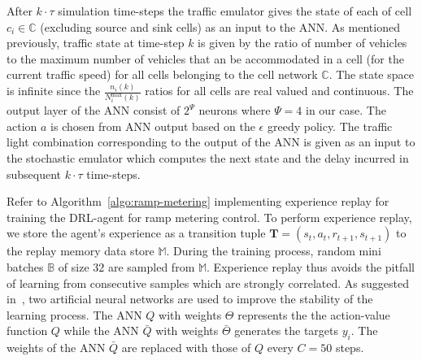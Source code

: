 \documentclass{sig-alternate-05-2015}
\begin{document}
After $k\cdot\tau$ simulation time-steps the traffic emulator gives the state of each of cell $c_i \in \mathbb{C}$ (excluding source and sink cells) as an input to the ANN.  As mentioned previously, traffic state at time-step $k$ is given by the ratio of number of vehicles to the maximum number of vehicles that an be accommodated in a cell (for the current traffic speed) for all cells belonging to the cell network $\mathbb{C}$. The state space is infinite since the $\frac{n_i(k)}{N_i^{\text{max}}(k)}$ ratios for all cells are real valued and continuous. The output layer of the ANN consist of $2^\Psi$ neurons where $\Psi=4$ in our case. The action $a$ is chosen from ANN output based on the $\epsilon$ greedy policy. The traffic light combination corresponding to the output of the ANN is given as an input to the stochastic emulator which computes the next state and the delay incurred in subsequent $k\cdot\tau$ time-steps. 

Refer to Algorithm~\ref{algo:ramp-metering} implementing experience replay for training the DRL-agent for ramp metering control. To perform experience replay,  we store the agent's experience as a transition tuple  $\mathbf{T}=(s_t, a_t,r_{t+1}, s_{t+1})$ to the replay memory data store $\mathbb{M}$.  During the training process, random mini batches $\mathbb{B}$ of size $32$  are sampled  from  $\mathbb{M}$. Experience replay thus avoids the pitfall of learning from consecutive samples which are strongly correlated. As suggested in~\cite{mnih2015human}, two artificial neural networks are used to improve the stability of the learning process. The ANN $Q$ with weights $\Theta$ represents the the action-value function $Q$ while the ANN $\bar{Q}$ with weights $\bar{\Theta}$ generates the targets $y_i$. The weights of the ANN $\bar{Q}$ are replaced with those of $Q$ every $C=50$ steps.
\end{document}
